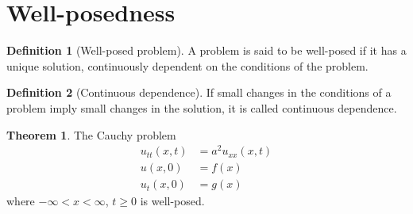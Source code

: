 \documentclass[titlepage, fleqn, a4paper, 12pt, twoside]{article}
\theoremstyle{definition}
\newtheorem{definition}{Definition}
\theoremstyle{theorem}
\newtheorem{theorem}{Theorem}
\begin{document}
\section{Well-posedness}

\begin{definition}[Well-posed problem]
	A problem is said to be well-posed if it has a unique solution, continuously dependent on the conditions of the problem.
\end{definition}

\begin{definition}[Continuous dependence]
	If small changes in the conditions of a problem imply small changes in the solution, it is called continuous dependence.
\end{definition}

\begin{theorem}
	The Cauchy problem
	\begin{align*}
		u_{t t}(x,t) & = a^2 u_{x x}(x,t) \\
		u(x,0)       & = f(x)             \\
		u_t(x,0)     & = g(x)
	\end{align*}
	where $-\infty < x < \infty$, $t \ge 0$ is well-posed.
\end{theorem}
\end{document}
